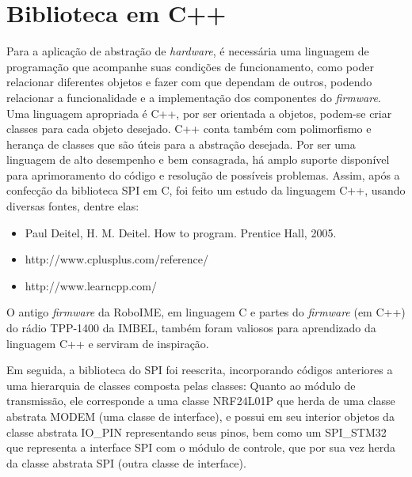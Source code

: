 \chapter{Biblioteca em C++}\label{cap:bibl_cpp}

Para a aplicação de abstração de \textit{hardware}, é necessária uma linguagem de programação que acompanhe suas condições de funcionamento, como poder relacionar diferentes objetos e fazer com que dependam de outros, podendo relacionar a funcionalidade e a implementação dos componentes do \textit{firmware}. Uma linguagem apropriada é C++, por ser orientada a objetos, podem-se criar classes para cada objeto desejado. C++ conta também com polimorfismo e herança de classes que são úteis para a abstração desejada. Por ser uma linguagem de alto desempenho e bem consagrada, há amplo suporte disponível para aprimoramento do código e resolução de possíveis problemas.
Assim, após a confecção da biblioteca SPI em C, foi feito um estudo da linguagem C++, usando diversas fontes, dentre elas:
\begin{itemize}
\item Paul Deitel, H. M. Deitel. How to program. Prentice Hall, 2005.
\item http://www.cplusplus.com/reference/
\item http://www.learncpp.com/
\end{itemize}

O antigo \textit{firmware} da RoboIME, em linguagem C e partes do \textit{firmware} (em C++) do rádio TPP-1400 da IMBEL, também foram valiosos para aprendizado da linguagem C++ e serviram de inspiração.

Em seguida, a biblioteca do SPI foi reescrita, incorporando códigos anteriores a uma hierarquia de classes composta pelas classes:
Quanto ao módulo de transmissão, ele corresponde a uma classe NRF24L01P que herda de uma classe abstrata MODEM (uma classe de interface), e possui em seu interior objetos da classe abstrata IO_PIN representando seus pinos, bem como um SPI_STM32 que representa a interface SPI com o módulo de controle, que por sua vez herda da classe abstrata SPI (outra classe de interface).


